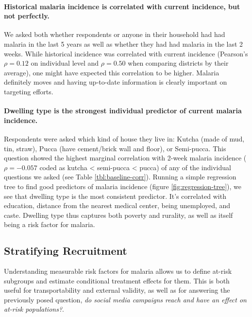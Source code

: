 \documentclass[a4paper,12pt]{article}
\begin{document}
\paragraph{Historical malaria incidence is correlated with current incidence, but not perfectly.} We asked both whether respondents or anyone in their household had had malaria in the last 5 years as well as whether they had had malaria in the last 2 weeks. While historical incidence was correlated with current incidence (Pearson's $\rho = 0.12$ on individual level and $\rho = 0.50$ when comparing districts by their average), one might have expected this correlation to be higher. Malaria definitely moves and having up-to-date information is clearly important on targeting efforts.



\paragraph{Dwelling type is the strongest individual predictor of current malaria incidence.} Respondents were asked which kind of house they live in: Kutcha (made of mud, tin, straw), Pucca (have cement/brick wall and floor), or Semi-pucca. This question showed the highest marginal correlation with 2-week malaria incidence ($\rho = -0.057$ coded as kutcha < semi-pucca < pucca) of any of the individual questions we asked (see Table \ref{tbl:baseline-corr}). Running a simple regression tree to find  good predictors of malaria incidence (figure \ref{fig:regression-tree}), we see that dwelling type is the most consistent predictor. It's correlated with education, distance from the nearest medical center, being unemployed, and caste. Dwelling type thus captures both poverty and rurality, as well as itself being a risk factor for malaria.






\subsection{Stratifying Recruitment}

Understanding measurable risk factors for malaria allows us to define at-risk subgroups and estimate conditional treatment effects for them. This is both useful for transportability and external validity, as well as for answering the previously posed question, \textit{do social media campaigns reach and have an effect on at-risk populations?}.
\end{document}
